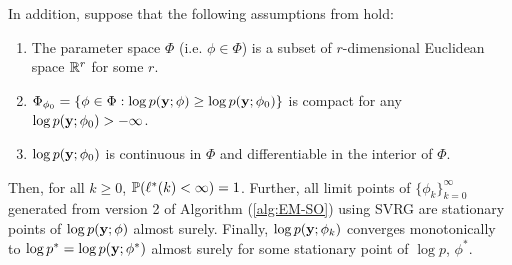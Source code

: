 \begin{theorem}
    In addition, suppose that the following assumptions from \citet{Wu:1983} hold:

    \begin{enumerate}
        \item The parameter space $\Phi$ (i.e. $\phi \in \Phi$) is a subset of $r$-dimensional Euclidean space $\mathbb{R}^r$ for some $r$.
        \item $\Phi_{\phi_0} = \{\phi \in \Phi: \log p(\mathbf{y};\phi) \geq \log p(\mathbf{y};\phi_0)\}$ is compact for any $\log p(\mathbf{y};\phi_0) > -\infty$.
        \item $\log p(\mathbf{y};\phi_0)$ is continuous in $\Phi$ and differentiable in the interior of $\Phi$.
    \end{enumerate}
    
    Then, for all $k \geq 0$, $\mathbb{P}(\ell^*(k) < \infty) = 1$. Further, all limit points of $\{\phi_{k}\}_{k=0}^\infty$ generated from version 2 of Algorithm (\ref{alg:EM-SO}) using SVRG are stationary points of $\log p(\mathbf{y};\phi)$ almost surely. Finally, $\log p(\mathbf{y};\phi_{k})$ converges monotonically to $\log p^* = \log p(\mathbf{y};\phi^*)$ almost surely for some stationary point of $\log p$, $\phi^*$.
\end{theorem}
%




